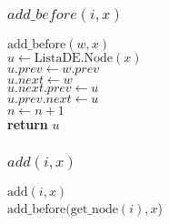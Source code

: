\documentclass{beamer}
\begin{document}
\begin{frame}
\frametitle{$add\_before(i,x)$}
\begin{oframed}
\begin{flushleft}
\hspace*{1em} \ensuremath{\mathrm{add\_before}(\ensuremath{\mathit{w}}, \ensuremath{\mathit{x}})}\\
\hspace*{1em} \hspace*{1em} \ensuremath{\ensuremath{\mathit{u}} \gets  \ensuremath{\mathrm{ListaDE}.\mathrm{\mathrm{Node}}(\ensuremath{\mathit{x}})}}\\
\hspace*{1em} \hspace*{1em} \ensuremath{\ensuremath{\mathit{u}}.\ensuremath{prev} \gets  \ensuremath{\ensuremath{\mathit{w}}.prev}}\\
\hspace*{1em} \hspace*{1em} \ensuremath{\ensuremath{\mathit{u}}.\ensuremath{next} \gets  \ensuremath{w}}\\
\hspace*{1em} \hspace*{1em} \ensuremath{\ensuremath{\mathit{u}}.\ensuremath{\ensuremath{\mathit{next}}.prev} \gets  \ensuremath{u}}\\
\hspace*{1em} \hspace*{1em} \ensuremath{\ensuremath{\mathit{u}}.\ensuremath{\ensuremath{\mathit{prev}}.next} \gets  \ensuremath{u}}\\
\hspace*{1em} \hspace*{1em} \ensuremath{\ensuremath{\mathit{n}} \gets  \ensuremath{\ensuremath{\mathit{n}} + 1}}\\
\hspace*{1em} \hspace*{1em} {\color{black} \textbf{return}} \ensuremath{\ensuremath{\mathit{u}}}\\
\end{flushleft}
\end{oframed}
\end{frame}


\begin{frame}
\frametitle{$add(i,x)$}
\begin{oframed}
\begin{flushleft}
\hspace*{1em} \ensuremath{\mathrm{add}(\ensuremath{\mathit{i}}, \ensuremath{\mathit{x}})}\\

\hspace*{1em} \hspace*{1em} \ensuremath{\mathrm{add\_before}(\mathrm{get\_node}(\ensuremath{\mathit{i}}), x})\\
\end{flushleft}
\end{oframed}
\end{frame}
\end{document}
